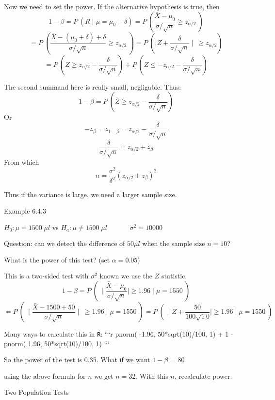 \documentclass[12pt]{article}
\begin{document}
Now we need to set the power. If the alternative hypothesis is true, then 
$$
1 - \beta = P\  ( R \mid \mu = \mu_0 + \delta) = P\ \left( \frac{\bar X - \mu_0}{\sigma/ \sqrt n} \geq z_{\alpha/2} \ \right)
$$
$$
= P\ \left( \frac{\bar X - (\mu_0 + \delta) + \delta}{\sigma/ \sqrt n} \geq z_{\alpha/2} \ \right) = P\ \left( \mid Z + \frac{\delta}{\sigma/\sqrt n} \mid \ \geq z_{\alpha/2} \right) 
$$
$$
= P\ \left(Z \geq z_{\alpha/2} -  \frac{\delta}{\sigma/\sqrt n}\right) + P\ \left(Z \leq - z_{\alpha/2} -  \frac{\delta}{\sigma/\sqrt n}\right) 
$$

The second summand here is really small, negligable. Thus:
$$
1 - \beta = P\ \left(Z \geq z_{\alpha/2} -  \frac{\delta}{\sigma/\sqrt n}\right)
$$
Or 
$$
-z_{\beta} = z_{1 - \beta} = z_{\alpha/2} - \frac{\delta}{\sigma/\sqrt n}
$$
$$
\frac{\delta}{\sigma/\sqrt n} = z_{\alpha/2} + z_{\beta}
$$
From which
$$
\boxed{n = \frac{\sigma^2}{\delta^2} ( z_{\alpha/2} + z_{\beta} )^2}
$$

Thus if the variance is large, we need a larger sample size. 

 Example 6.4.3
 
 $H_0: \mu = 1500 \; \mu l$  vs  
 $H_a: \mu \neq 1500 \; \mu l \; \; \; \; \; \; \; \; \; \; \; \;  \sigma^2 = 10 000$   


Question: can we detect the difference of $50 \mu l$ when the sample size $n =10$?

What is the power of this test? (set $\alpha = 0.05$)

This is a two-sided test with $\sigma^2$ known we use the $Z$ statistic.
$$
1 - \beta = P\ \left( \ \mid \frac{\bar X - \mu_0}{\sigma/ \sqrt n} \mid \geq 1.96 \mid \mu = 1550 \ \right)
$$
$$
= P\ \left( \ \mid \frac{\bar X - 1500 + 50}{\sigma/ \sqrt n} \mid \; \geq 1.96  \; \Big| \;   \mu = 1550 \ \right) = P\ \left( \ \mid Z + \frac{50}{100 \sqrt 10} \mid \geq 1.96 \; \Big| \;  \mu = 1550 \ \right)
$$

Many ways to calculate this in \texttt{R}:
```{r}
pnorm( -1.96, 50*sqrt(10)/100, 1) + 1 - pnorm( 1.96, 50*sqrt(10)/100, 1)
```

So the power of the test is 0.35. What if we want $1 - \beta$ = 80%


using the above formula for $n$ we get $n = 32$. With this $n$, recalculate power:


Two Population Tests
\end{document}
